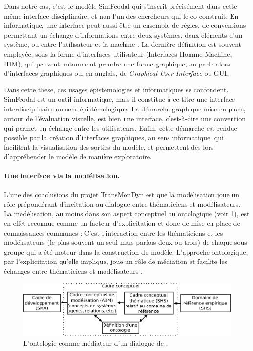 Dans notre cas, c'est le modèle SimFeodal qui s'inscrit précisément dans cette même interface disciplinaire, et non l'un des chercheurs qui le co-construit.
En informatique, une interface peut aussi être un \og ensemble de règles, de conventions permettant un échange d’informations entre deux systèmes, deux éléments d’un système, ou entre l’utilisateur et la machine\fg{} \autocite{academie_francaise_interface_2019}.
La dernière définition est souvent employée, sous la forme \og d'interfaces utilisateur\fg{} (Interfaces Homme-Machine, IHM), qui peuvent notamment prendre une forme graphique, on parle alors d'interfaces graphiques ou, en anglais, de \og \textit{Graphical User Interface}\fg{} ou GUI.

Dans cette thèse, ces usages épistémologies et informatiques se confondent.
SimFeodal est un outil informatique, mais il constitue à ce titre une interface interdisciplinaire au sens épistémologique.
La démarche graphique mise en place, autour de l'évaluation visuelle, est bien une interface, c'est-à-dire une \og convention qui permet un échange\fg{} entre les utilisateurs.
Enfin, cette démarche est rendue possible par la création d'interfaces graphiques, au sens informatique, qui facilitent la visualisation des sorties du modèle, et permettent dès lors d'appréhender le modèle de manière exploratoire.


\paragraph{Une interface via la modélisation.}

L'une des conclusions du projet TransMonDyn est que la modélisation joue un rôle prépondérant d'incitation au dialogue entre thématiciens et modélisateurs.
La modélisation, au moins dans son aspect conceptuel ou ontologique (voir \cref{fig:ontologie-mediateur}), est en effet reconnue comme un facteur d'explicitation et donc de mise en place de connaissances communes :
\og C'est l'interaction entre les thématiciens et les modélisateurs (le plus souvent un seul mais parfois deux ou trois) de chaque sous-groupe qui a été moteur dans la construction du modèle.
\textelp{}
L'approche ontologique, par l'explicitation qu'elle implique, joue un rôle de médiation et facilite les échanges entre thématiciens et modélisateurs \fg{} \autocite[458]{sanders_points_2017}.

\begin{figure}[H]
	\centering
	\includegraphics[width=\linewidth]{img/schema_phan.pdf}
	\caption[\og L'ontologie comme médiateur d'un dialogue \fg{} de \textcite{phan_ontologies_2014}]{\og L'ontologie comme médiateur d'un dialogue \fg{} de \textcite[fig. 2.7, \ppno~68]{phan_ontologies_2014}.}
	\label{fig:ontologie-mediateur}
\end{figure}

